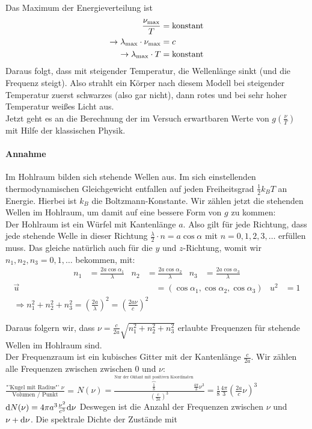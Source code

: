 \begin{folgerung*}
Das Maximum der Energieverteilung  ist
\begin{align*}
\frac{\nu_\text{max}}{T} &= \text{konstant}\\
\rightarrow \lambda_\text{max} \cdot \nu_\text{max} &= c\\
\rightarrow \lambda_\text{max} \cdot T &= \text{konstant}
\end{align*}
Daraus folgt, dass mit steigender Temperatur, die Wellenlänge sinkt (und die Frequenz steigt). Also strahlt ein Körper nach diesem Modell bei steigender Temperatur zuerst schwarzes (also gar nicht), dann rotes und bei sehr hoher Temperatur weißes Licht aus.\\
Jetzt geht es an die Berechnung der im Versuch erwartbaren Werte von $g(\frac{\nu}{T})$ mit Hilfe der klassischen Physik.
\paragraph{Annahme} Im Hohlraum bilden sich stehende Wellen aus. Im sich einstellenden thermodynamischen Gleichgewicht entfallen auf jeden Freiheitsgrad $\frac12 k_B T$ an Energie. Hierbei ist $k_B$ die
Boltzmann-Konstante. Wir zählen jetzt die stehenden Wellen im Hohlraum, um damit auf eine bessere Form von $g$ zu kommen:\\
Der Hohlraum ist ein Würfel mit Kantenlänge $a$. Also gilt für jede Richtung, dass jede stehende Welle in dieser Richtung $\frac{\lambda}{2}\cdot n = a \cos \alpha$ mit $n = 0, 1, 2, 3, \dots$ erfüllen muss. Das gleiche natürlich auch für die $y$ und $z$-Richtung, womit wir $n_1, n_2, n_3 = 0, 1, \dots$ bekommen, mit:
\begin{align*}
n_1 &= \frac{2 a \cos \alpha_1}{\lambda} & n_2 &= \frac{2 a \cos \alpha_2}{\lambda} & n_3 &= \frac{2 a \cos \alpha_3}{\lambda}
\end{align*}
\begin{align*}
\vec{u} &= (\cos \alpha_1, \cos \alpha_2, \cos \alpha_3) & u^2 &= 1\\
\Rightarrow n_1^2 + n_2^2 + n_3^2 = (\frac{2a}{\lambda})^2 = (\frac{2 a \nu}{c})^2
\end{align*}

Daraus folgern wir, dass $\nu = \frac{c}{2a} \sqrt{n_1^2 + n_2^2 + n_3^2}$ erlaubte Frequenzen für stehende Wellen im Hohlraum sind.\\
Der Frequenzraum ist ein kubisches Gitter mit der Kantenlänge $\frac{c}{2a}$. Wir zählen alle Frequenzen zwischen  zwischen 0 und $\nu$:\\
$\frac{\text{"'Kugel mit Radius"'~}\nu}{\text{Volumen / Punkt}}$ =
$N(\nu) = \frac{\overbrace{\frac18}^
	\text{Nur der Oktant mit positiven Koordinaten} 
	\frac{4\pi}{3}\nu^3
	}{(\frac{c}{2a})^3} = \frac{1}{8} \frac{4\pi}{3}
 (\frac{2a}{c}\nu)^3$\\
 $\mathrm d N(\nu) = 4 \pi a^3 \frac{\nu^2}{c^3} \mathrm d \nu$ Deswegen ist die Anzahl der Frequenzen zwischen $\nu$ und $\nu + \mathrm d \nu$. Die spektrale Dichte der Zustände mit


\end{folgerung*}

